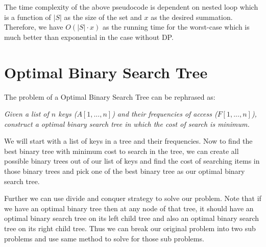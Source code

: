 \documentclass[11pt]{article}
\theoremstyle{definition}
\begin{document}
The time complexity of the above pseudocode is dependent on nested loop which is a function of $|S|$ as the size of the set and $x$ as the desired summation. Therefore, we have $O(|S|\cdot x)$ as the running time for the worst-case which is much better than exponential in the case without DP.

\section{Optimal Binary Search Tree}
        The problem of a Optimal Binary Search Tree can be rephrased as:

    \emph{Given a list of $n$ keys ($A[1, ..., n]$) and their frequencies of access ($F[1, ..., n]$), construct a optimal binary search tree in which the cost of search is minimum.}
    
    We will start with a list of keys in a tree and their frequencies. Now to find the best binary tree with minimum cost to search in the tree, we can create all possible binary trees out of our list of keys and find the cost of searching items in those binary trees and pick one of the best binary tree as our optimal binary search tree.
    
    Further we can use divide and conquer strategy to solve our problem. Note that if we have an optimal binary tree then at any node of that tree, it should have an optimal binary search tree on its left child tree and also an optimal binary search tree on its right child tree. Thus we can break our original problem into two sub problems and use same method to solve for those sub problems.
    
\end{document}
